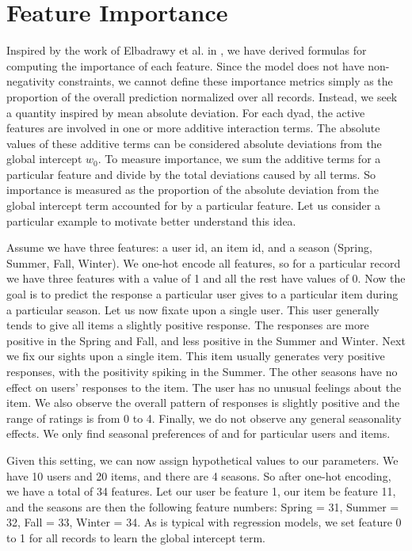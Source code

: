 \documentclass[10pt]{journal}
\begin{document}
\section{Feature Importance}

Inspired by the work of Elbadrawy et al. in \cite{elbadrawy_personalized_2015},
we have derived formulas for computing the importance of each feature. Since the
model does not have non-negativity constraints, we cannot define these
importance metrics simply as the proportion of the overall prediction normalized
over all records. Instead, we seek a quantity inspired by mean absolute
deviation. For each dyad, the active features are involved in one or more
additive interaction terms. The absolute values of these additive terms can be
considered absolute deviations from the global intercept $w_0$. To measure
importance, we sum the additive terms for a particular feature and divide by the
total deviations caused by all terms. So importance is measured as the
proportion of the absolute deviation from the global intercept term accounted
for by a particular feature. Let us consider a particular example to motivate
better understand this idea.

Assume we have three features: a user id, an item id, and a season (Spring,
Summer, Fall, Winter). We one-hot encode all features, so for a particular
record we have three features with a value of 1 and all the rest have values of
0. Now the goal is to predict the response a particular user gives to a
particular item during a particular season. Let us now fixate upon a single
user. This user generally tends to give all items a slightly positive response.
The responses are more positive in the Spring and Fall, and less positive in the
Summer and Winter. Next we fix our sights upon a single item. This item usually
generates very positive responses, with the positivity spiking in the Summer.
The other seasons have no effect on users' responses to the item. The user has
no unusual feelings about the item. We also observe the overall pattern of
responses is slightly positive and the range of ratings is from 0 to 4. Finally,
we do not observe any general seasonality effects. We only find seasonal
preferences of and for particular users and items.

Given this setting, we can now assign hypothetical values to our parameters. We
have 10 users and 20 items, and there are 4 seasons. So after one-hot encoding,
we have a total of 34 features. Let our user be feature 1, our item be feature
11, and the seasons are then the following feature numbers: Spring = 31, Summer
= 32, Fall = 33, Winter = 34. As is typical with regression models, we set
feature 0 to 1 for all records to learn the global intercept term.
\end{document}
